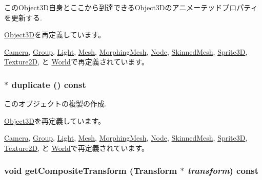 このObject3D自身とここから到達できるObject3Dのアニメーテッドプロパティを更新する. 

\hyperlink{classm3g_1_1Object3D_8aad1ceab4c2a03609c8a42324ce484d}{Object3D}を再定義しています。

\hyperlink{classm3g_1_1Camera_8aad1ceab4c2a03609c8a42324ce484d}{Camera}, \hyperlink{classm3g_1_1Group_8aad1ceab4c2a03609c8a42324ce484d}{Group}, \hyperlink{classm3g_1_1Light_8aad1ceab4c2a03609c8a42324ce484d}{Light}, \hyperlink{classm3g_1_1Mesh_8aad1ceab4c2a03609c8a42324ce484d}{Mesh}, \hyperlink{classm3g_1_1MorphingMesh_8aad1ceab4c2a03609c8a42324ce484d}{MorphingMesh}, \hyperlink{classm3g_1_1Node_8aad1ceab4c2a03609c8a42324ce484d}{Node}, \hyperlink{classm3g_1_1SkinnedMesh_8aad1ceab4c2a03609c8a42324ce484d}{SkinnedMesh}, \hyperlink{classm3g_1_1Sprite3D_8aad1ceab4c2a03609c8a42324ce484d}{Sprite3D}, \hyperlink{classm3g_1_1Texture2D_8aad1ceab4c2a03609c8a42324ce484d}{Texture2D}, と \hyperlink{classm3g_1_1World_8aad1ceab4c2a03609c8a42324ce484d}{World}で再定義されています。\hypertarget{classm3g_1_1Transformable_4f64f95a34c56cb1553dc6de660dff6f}{
\subsubsection[{duplicate}]{ $\ast$ duplicate () const}}
\label{classm3g_1_1Transformable_4f64f95a34c56cb1553dc6de660dff6f}


このオブジェクトの複製の作成. 

\hyperlink{classm3g_1_1Object3D_a25110dac934f867b83b73ad4741a0f4}{Object3D}を再定義しています。

\hyperlink{classm3g_1_1Camera_6279f7f8ab52af683fadd193d7694f2d}{Camera}, \hyperlink{classm3g_1_1Group_1212dbd493e73180a6204874bd97df6b}{Group}, \hyperlink{classm3g_1_1Light_7a41af040d0c1566358d84f089cd0cd1}{Light}, \hyperlink{classm3g_1_1Mesh_52ce6d0b3eda2bd3a95bfb5b7dbb6f82}{Mesh}, \hyperlink{classm3g_1_1MorphingMesh_7e7b2c3c4c988c6341a5e249bd468f57}{MorphingMesh}, \hyperlink{classm3g_1_1Node_0b9f7531a4b56d34f47aeb1fff0d37e0}{Node}, \hyperlink{classm3g_1_1SkinnedMesh_d3f422cf7656b73687d789094c7eae42}{SkinnedMesh}, \hyperlink{classm3g_1_1Sprite3D_0af34e87be803eb476f9e118d2363246}{Sprite3D}, \hyperlink{classm3g_1_1Texture2D_f4b50abcea8e4a6d6981c779d5009c05}{Texture2D}, と \hyperlink{classm3g_1_1World_efde97aaf753d48fff769d9011f187f2}{World}で再定義されています。\hypertarget{classm3g_1_1Transformable_263ef66efed11b7f9678e2e4bbec4c55}{
\subsubsection[{getCompositeTransform}]{\setlength{\rightskip}{0pt plus 5cm}void getCompositeTransform ({\bf Transform} $\ast$ {\em transform}) const}}
\label{classm3g_1_1Transformable_263ef66efed11b7f9678e2e4bbec4c55}


